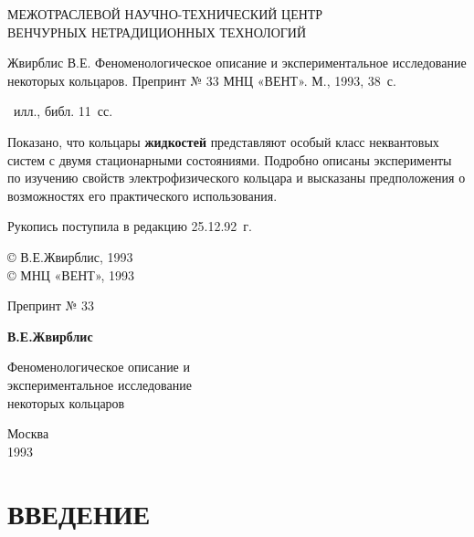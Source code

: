 \documentclass[12pt,a4paper]{article}
\begin{document}
\begin{titlepage}
\begin{flushright}
{\small МЕЖОТРАСЛЕВОЙ НАУЧНО-ТЕХНИЧЕСКИЙ ЦЕНТР\\
ВЕНЧУРНЫХ НЕТРАДИЦИОННЫХ ТЕХНОЛОГИЙ}
\end{flushright}

\vspace{2cm}
\begin{flushleft}
{\small Жвирблис В.Е. Феноменологическое описание и экспериментальное
исследование некоторых кольцаров. Препринт № 33 МНЦ «ВЕНТ».
М., 1993, 38~с.

~илл., библ. 11~сс.}
\end{flushleft}

\vspace{1cm}
\begin{flushleft}
{\small Показано, что кольцары \textbf{жидкостей} представляют особый класс
неквантовых систем с двумя стационарными состояниями. Подробно описаны
эксперименты по изучению свойств электрофизического кольцара
и высказаны предположения о возможностях его практического использования.}

\medskip
{\small Рукопись поступила в редакцию 25.12.92~г.}
\end{flushleft}

\vfill
\begin{flushleft}
{\small © В.Е.Жвирблис, 1993\\
© МНЦ «ВЕНТ», 1993}
\end{flushleft}

\hfill
\begin{minipage}{0.45\textwidth}
\begin{flushright}
{\large Препринт № 33}

\bigskip
{\large \textbf{В.Е.Жвирблис}}

\bigskip
Феноменологическое описание и\\
экспериментальное исследование\\
некоторых кольцаров

\vspace{2cm}
{\small Москва\\
1993}
\end{flushright}
\end{minipage}
\end{titlepage}

\setcounter{page}{3}

\section*{ВВЕДЕНИЕ}
\end{document}
